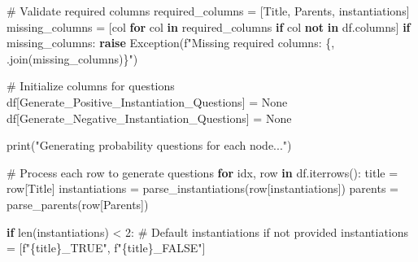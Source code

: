 \documentclass[
  11pt,
  letterpaper,
]{book}
\newenvironment{Shaded}{\begin{snugshade}}{\end{snugshade}}
\newcommand{\BuiltInTok}[1]{\textcolor[rgb]{0.00,0.23,0.31}{#1}}
\newcommand{\CommentTok}[1]{\textcolor[rgb]{0.37,0.37,0.37}{#1}}
\newcommand{\ControlFlowTok}[1]{\textcolor[rgb]{0.00,0.23,0.31}{\textbf{#1}}}
\newcommand{\DecValTok}[1]{\textcolor[rgb]{0.68,0.00,0.00}{#1}}
\newcommand{\KeywordTok}[1]{\textcolor[rgb]{0.00,0.23,0.31}{\textbf{#1}}}
\newcommand{\NormalTok}[1]{\textcolor[rgb]{0.00,0.23,0.31}{#1}}
\newcommand{\OperatorTok}[1]{\textcolor[rgb]{0.37,0.37,0.37}{#1}}
\newcommand{\PreprocessorTok}[1]{\textcolor[rgb]{0.68,0.00,0.00}{#1}}
\newcommand{\SpecialCharTok}[1]{\textcolor[rgb]{0.37,0.37,0.37}{#1}}
\newcommand{\SpecialStringTok}[1]{\textcolor[rgb]{0.13,0.47,0.30}{#1}}
\newcommand{\StringTok}[1]{\textcolor[rgb]{0.13,0.47,0.30}{#1}}
\newcommand{\VariableTok}[1]{\textcolor[rgb]{0.07,0.07,0.07}{#1}}
\begin{document}
\begin{Shaded}
\begin{Highlighting}[]
    \CommentTok{\# Validate required columns}
\NormalTok{    required\_columns }\OperatorTok{=}\NormalTok{ [}\StringTok{\textquotesingle{}Title\textquotesingle{}}\NormalTok{, }\StringTok{\textquotesingle{}Parents\textquotesingle{}}\NormalTok{, }\StringTok{\textquotesingle{}instantiations\textquotesingle{}}\NormalTok{]}
\NormalTok{    missing\_columns }\OperatorTok{=}\NormalTok{ [col }\ControlFlowTok{for}\NormalTok{ col }\KeywordTok{in}\NormalTok{ required\_columns }\ControlFlowTok{if}\NormalTok{ col }\KeywordTok{not} \KeywordTok{in}\NormalTok{ df.columns]}
    \ControlFlowTok{if}\NormalTok{ missing\_columns:}
        \ControlFlowTok{raise} \PreprocessorTok{Exception}\NormalTok{(}\SpecialStringTok{f"Missing required columns: }\SpecialCharTok{\{}\StringTok{\textquotesingle{}, \textquotesingle{}}\SpecialCharTok{.}\NormalTok{join(missing\_columns)}\SpecialCharTok{\}}\SpecialStringTok{"}\NormalTok{)}

    \CommentTok{\# Initialize columns for questions}
\NormalTok{    df[}\StringTok{\textquotesingle{}Generate\_Positive\_Instantiation\_Questions\textquotesingle{}}\NormalTok{] }\OperatorTok{=} \VariableTok{None}
\NormalTok{    df[}\StringTok{\textquotesingle{}Generate\_Negative\_Instantiation\_Questions\textquotesingle{}}\NormalTok{] }\OperatorTok{=} \VariableTok{None}

    \BuiltInTok{print}\NormalTok{(}\StringTok{"Generating probability questions for each node..."}\NormalTok{)}

    \CommentTok{\# Process each row to generate questions}
    \ControlFlowTok{for}\NormalTok{ idx, row }\KeywordTok{in}\NormalTok{ df.iterrows():}
\NormalTok{        title }\OperatorTok{=}\NormalTok{ row[}\StringTok{\textquotesingle{}Title\textquotesingle{}}\NormalTok{]}
\NormalTok{        instantiations }\OperatorTok{=}\NormalTok{ parse\_instantiations(row[}\StringTok{\textquotesingle{}instantiations\textquotesingle{}}\NormalTok{])}
\NormalTok{        parents }\OperatorTok{=}\NormalTok{ parse\_parents(row[}\StringTok{\textquotesingle{}Parents\textquotesingle{}}\NormalTok{])}

        \ControlFlowTok{if} \BuiltInTok{len}\NormalTok{(instantiations) }\OperatorTok{\textless{}} \DecValTok{2}\NormalTok{:}
            \CommentTok{\# Default instantiations if not provided}
\NormalTok{            instantiations }\OperatorTok{=}\NormalTok{ [}\SpecialStringTok{f"}\SpecialCharTok{\{}\NormalTok{title}\SpecialCharTok{\}}\SpecialStringTok{\_TRUE"}\NormalTok{, }\SpecialStringTok{f"}\SpecialCharTok{\{}\NormalTok{title}\SpecialCharTok{\}}\SpecialStringTok{\_FALSE"}\NormalTok{]}


\end{Highlighting}
\end{Shaded}
\end{document}
